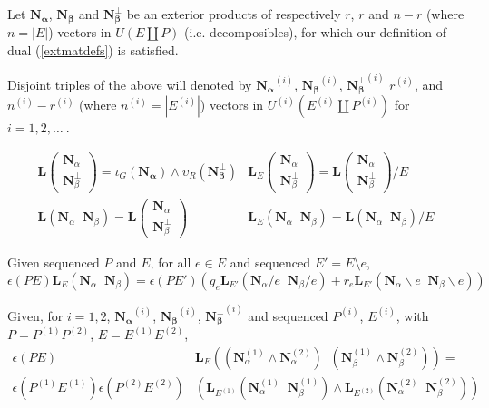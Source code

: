 \documentclass[Unicode]{cedram-alco}
\newcommand{\ext}[1]{\ensuremath{\mathbf{#1}}}
\newcommand{\eNal}{\ensuremath{\ext{N}_{\alpha}}}
\newcommand{\eNbePe}{\ensuremath{\ext{N}_{\beta}^{\perp}}}
\newcommand{\eNbe}{\ensuremath{\ext{N}_\beta}}
\newcommand{\Is}{\ensuremath{\iota}}
\newcommand{\Vs}{\ensuremath{\upsilon}}
\newcommand{\dunion}{\coprod}
\newcommand{\extLVert}[2]{\ext{L}\left( \begin{array}{c} {#1}\\ {#2} \end{array} \right)}
\newcommand{\extLHorSub}[3]{\ext{L}_{#1}\left(  {#2}\;\; {#3}  \right)}
\newcommand{\LVert}[2]{\ext{L}\left( \begin{array}{c} {#1}\\ {#2} \end{array} \right)}
\newcommand{\LVertSub}[3]{\ext{L}_{#1}\left( \begin{array}{c} {#2}\\ {#3} \end{array} \right)}
\newcommand{\LHor}[2]{\ext{L}\left( {#1}\;\; {#2} \right)}
\newcommand{\LHorSub}[3]{\ext{L}_{#1}\left(  {#2}\;\; {#3}  \right)}
\begin{document}
\begin{defi}
  Let $\ext{N_\alpha}$,  $\ext{N_\beta}$ and $\ext{N_\beta^\perp}$ be an exterior products
  of respectively
  $r$, $r$ and $n-r$ (where $n=|E|$)  vectors in $U(E\dunion P)$
  (i.e. decomposibles), for which our  
  definition of dual (\ref{extmatdefs}) is satisfied.

  Disjoint triples of the above will denoted by
  $\ext{N_\alpha}^{(i)}$,  $\ext{N_\beta}^{(i)}$, $\ext{N_\beta^\perp}^{(i)}$ 
  $r^{(i)}$, and $n^{(i)}-r^{(i)}$ (where $n^{(i)}=|E^{(i)}|$)  vectors in
  $U^{(i)}(E^{(i)}\dunion P^{(i)})$ for $i=1, 2, \ldots\ $.

\end{defi}

\begin{defi}
  \begin{equation}
  \begin{array}{cc}
    \LVert{\eNal}{\eNbePe} = \Is_G(\ext{N_\alpha})\wedge\Vs_R(\ext{N_{\beta}^\perp}) &
    \LVertSub{E}{\eNal}{\eNbePe} = \LVert{\eNal}{\eNbePe}/E\\
    \LHor{\eNal}{\eNbe}=\extLVert{\eNal}{\eNbePe} &
    \LHorSub{E}{\eNal}{\eNbe}=\LHor{\eNal}{\eNbe}/E
  \end{array}
  \end{equation}
\end{defi}

\begin{theo}
  Given sequenced $P$ and $E$, for all $e\in E$ and sequenced $E'=E\setminus e$,
  \begin{equation}\label{delecontrequation}
     \epsilon(PE)\extLHorSub{E}{\eNal}{\eNbe}=
      \epsilon(PE')
      \left(
      g_e\extLHorSub{E'}{\eNal/e}{\eNbe/e} +
      r_e\extLHorSub{E'}{\eNal\backslash e}{\eNbe\backslash e}\right)
  \end{equation}

  Given, for $i = 1, 2$,
  $\ext{N_\alpha}^{(i)}$,  $\ext{N_\beta}^{(i)}$, $\ext{N_\beta^\perp}^{(i)}$ 
  and
  sequenced $P^{(i)}$, $E^{(i)}$, with $P=P^{(1)}P^{(2)}$, $E=E^{(1)}E^{(2)}$,
  \begin{equation}\label{productequation}
    \begin{split}
    \epsilon(PE)
    &\LHorSub{E}
            {(\ext{N}_\alpha^{(1)}\wedge\ext{N}_\alpha^{(2)})}
            {(\ext{N}_\beta^{(1)}\wedge\ext{N}_\beta^{(2)})}
    = \\
    \epsilon(P^{(1)}E^{(1)})
    \epsilon(P^{(2)}E^{(2)}) 
        &\left(\LHorSub{E^{(1)}}{\ext{N}_\alpha^{(1)}}{\ext{N}_\beta^{(1)}}
        \wedge
        \LHorSub{E^{(2)}}{\ext{N}_\alpha^{(2)}}{\ext{N}_\beta^{(2)}}
          \right)
    \end{split}
  \end{equation}

\end{theo}
  
\end{document}
